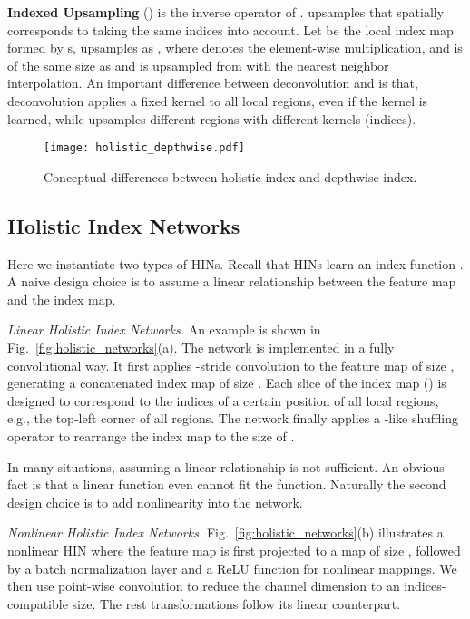 \documentclass[10pt,twocolumn,letterpaper]{article}
\begin{document}
\vspace{5pt}
\noindent\textbf{Indexed Upsampling} () is the inverse operator of .  upsamples  that spatially corresponds to  taking the same indices into account. Let  be the local index map formed by s,  upsamples  as , where  denotes the element-wise multiplication, and  is of the same size as  and is upsampled from  with the nearest neighbor interpolation. An important difference between deconvolution and  is that, deconvolution applies a fixed kernel to all local regions, even if the kernel is learned, while  upsamples different regions with different kernels (indices).


\begin{figure}[!tb]
	\captionsetup{font=small,singlelinecheck=true}
	\setlength{\abovecaptionskip}{10pt}
	\centering
	\texttt{[image: holistic\_depthwise.pdf]}
\caption{Conceptual differences between holistic index and depthwise index.}
	\label{fig:holistic_depthwise}
\end{figure}

\subsection{Holistic Index Networks}\label{subsec:holistic_networks}

Here we instantiate two types of HINs. Recall that HINs learn an index function . A naive design choice is to assume a linear relationship between the feature map and the index map.

\vspace{5pt}
\noindent\textit{Linear Holistic Index Networks.} An example is shown in Fig.~\ref{fig:holistic_networks}(a). The network is implemented in a fully convolutional way. It first applies -stride  convolution to the feature map of size , generating a concatenated index map of size . Each slice of the index map () is designed to correspond to the indices of a certain position of all local regions, e.g., the top-left corner of all  regions. The network finally applies a -like shuffling operator to rearrange the index map to the size of .

In many situations, assuming a linear relationship is not sufficient. An obvious fact is that a linear function even cannot fit the  function. Naturally the second design choice is to add nonlinearity into the network.

\vspace{5pt}
\noindent\textit{Nonlinear Holistic Index Networks.} Fig.~\ref{fig:holistic_networks}(b) illustrates a nonlinear HIN where the feature map is first projected to a map of size , followed by a batch normalization layer and a ReLU function for nonlinear mappings. We then use point-wise convolution to reduce the channel dimension to an indices-compatible size. The rest transformations follow its linear counterpart.
\end{document}
